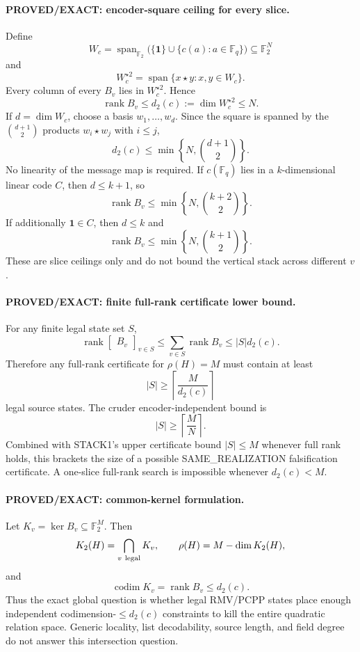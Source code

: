 \documentclass[11pt]{article}
\begin{document}
\paragraph{PROVED/EXACT: encoder-square ceiling for every slice.}
Define
\[
W_c=\operatorname{span}_{\mathbb F_2}\bigl(\{\mathbf 1\}\cup\{c(a):a\in\mathbb F_q\}\bigr)
\subseteq\mathbb F_2^N
\]
and
\[
W_c^{\star2}=\operatorname{span}\{x\star y:x,y\in W_c\}.
\]
Every column of every \(B_v\) lies in \(W_c^{\star2}\). Hence
\[
\boxed{\operatorname{rank}B_v\le d_2(c):=\dim W_c^{\star2}\le N.}
\]
If \(d=\dim W_c\), choose a basis \(w_1,\ldots,w_d\). Since the square is spanned by the \(\binom{d+1}{2}\) products \(w_i\star w_j\) with \(i\le j\),
\[
\boxed{d_2(c)\le \min\left\{N,\binom{d+1}{2}\right\}.}
\]
No linearity of the message map is required. If \(c(\mathbb F_q)\) lies in a \(k\)-dimensional linear code \(C\), then \(d\le k+1\), so
\[
\operatorname{rank}B_v\le\min\left\{N,\binom{k+2}{2}\right\}.
\]
If additionally \(\mathbf1\in C\), then \(d\le k\) and
\[
\operatorname{rank}B_v\le\min\left\{N,\binom{k+1}{2}\right\}.
\]
These are slice ceilings only and do not bound the vertical stack across different \(v\).

\paragraph{PROVED/EXACT: finite full-rank certificate lower bound.}
For any finite legal state set \(S\),
\[
\operatorname{rank}\begin{bmatrix}B_v\end{bmatrix}_{v\in S}
\le \sum_{v\in S}\operatorname{rank}B_v
\le |S|d_2(c).
\]
Therefore any full-rank certificate for \(\rho(H)=M\) must contain at least
\[
\boxed{|S|\ge \left\lceil\frac{M}{d_2(c)}\right\rceil}
\]
legal source states. The cruder encoder-independent bound is
\[
|S|\ge\left\lceil\frac{M}{N}\right\rceil.
\]
Combined with STACK1's upper certificate bound \(|S|\le M\) whenever full rank holds, this brackets the size of a possible SAME\_REALIZATION falsification certificate. A one-slice full-rank search is impossible whenever \(d_2(c)<M\).

\paragraph{PROVED/EXACT: common-kernel formulation.}
Let \(K_v=\ker B_v\subseteq\mathbb F_2^M\). Then
\[
K_2(H)=\bigcap_{v\ {\rm legal}}K_v,\qquad
\rho(H)=M-\dim K_2(H),
\]
and
\[
\operatorname{codim}K_v=\operatorname{rank}B_v\le d_2(c).
\]
Thus the exact global question is whether legal RMV/PCPP states place enough independent codimension-\(\le d_2(c)\) constraints to kill the entire quadratic relation space. Generic locality, list decodability, source length, and field degree do not answer this intersection question.
\end{document}
